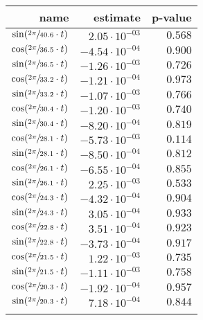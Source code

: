 \begin{tabular}{r|rr}
\hline
 name                               & estimate               & p-value   \\
\hline
 $\sin(\sfrac{2\pi}{40.6} \cdot t)$ & $2.05 \cdot 10^{-03}$  & $0.568$   \\
 $\cos(\sfrac{2\pi}{36.5} \cdot t)$ & $-4.54 \cdot 10^{-04}$ & $0.900$   \\
 $\sin(\sfrac{2\pi}{36.5} \cdot t)$ & $-1.26 \cdot 10^{-03}$ & $0.726$   \\
 $\cos(\sfrac{2\pi}{33.2} \cdot t)$ & $-1.21 \cdot 10^{-04}$ & $0.973$   \\
 $\sin(\sfrac{2\pi}{33.2} \cdot t)$ & $-1.07 \cdot 10^{-03}$ & $0.766$   \\
 $\cos(\sfrac{2\pi}{30.4} \cdot t)$ & $-1.20 \cdot 10^{-03}$ & $0.740$   \\
 $\sin(\sfrac{2\pi}{30.4} \cdot t)$ & $-8.20 \cdot 10^{-04}$ & $0.819$   \\
 $\cos(\sfrac{2\pi}{28.1} \cdot t)$ & $-5.73 \cdot 10^{-03}$ & $0.114$   \\
 $\sin(\sfrac{2\pi}{28.1} \cdot t)$ & $-8.50 \cdot 10^{-04}$ & $0.812$   \\
 $\cos(\sfrac{2\pi}{26.1} \cdot t)$ & $-6.55 \cdot 10^{-04}$ & $0.855$   \\
 $\sin(\sfrac{2\pi}{26.1} \cdot t)$ & $2.25 \cdot 10^{-03}$  & $0.533$   \\
 $\cos(\sfrac{2\pi}{24.3} \cdot t)$ & $-4.32 \cdot 10^{-04}$ & $0.904$   \\
 $\sin(\sfrac{2\pi}{24.3} \cdot t)$ & $3.05 \cdot 10^{-04}$  & $0.933$   \\
 $\cos(\sfrac{2\pi}{22.8} \cdot t)$ & $3.51 \cdot 10^{-04}$  & $0.923$   \\
 $\sin(\sfrac{2\pi}{22.8} \cdot t)$ & $-3.73 \cdot 10^{-04}$ & $0.917$   \\
 $\cos(\sfrac{2\pi}{21.5} \cdot t)$ & $1.22 \cdot 10^{-03}$  & $0.735$   \\
 $\sin(\sfrac{2\pi}{21.5} \cdot t)$ & $-1.11 \cdot 10^{-03}$ & $0.758$   \\
 $\cos(\sfrac{2\pi}{20.3} \cdot t)$ & $-1.92 \cdot 10^{-04}$ & $0.957$   \\
 $\sin(\sfrac{2\pi}{20.3} \cdot t)$ & $7.18 \cdot 10^{-04}$  & $0.844$   \\
                                    &                        &           \\
\hline
\end{tabular}